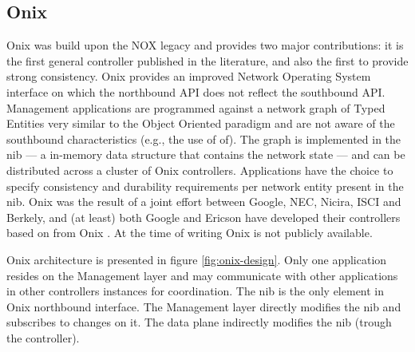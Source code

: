 

\subsection{Onix}
\label{sec:related:onix}

Onix \cite{Koponen:2010th}  was build upon the NOX legacy and provides two major contributions: it is the first general controller published in the literature, and also the first to provide strong consistency.  
Onix  provides an improved Network Operating System interface on  which the northbound API does not reflect the southbound API. 
Management applications are programmed against a network graph of Typed Entities very similar to the Object Oriented paradigm and are not aware of the southbound characteristics (e.g., the use of \gls{of}). 
The graph is implemented in  the \gls{nib}  --- a in-memory data structure that contains the network state ---  and can be distributed across a  cluster of  Onix controllers. 
Applications have the choice to specify consistency and durability requirements  per network entity  present in the \gls{nib}.  
Onix was the result of a joint effort between Google, NEC, Nicira, ISCI and Berkely, and (at least)  both Google and Ericson have developed their controllers based on from Onix \cite{The-Valley-of-the-Nerd.:fk}. 
At the time of writing Onix is not publicly available. 

Onix architecture is presented in figure \ref{fig:onix-design}. 
Only one application resides on the  Management layer and may communicate with other applications in other controllers instances for coordination. 
The \gls{nib} is the only element in Onix northbound interface. 
The Management layer directly modifies the \gls{nib} and subscribes to changes on it. 
The data plane  indirectly modifies the \gls{nib} (trough the controller).


